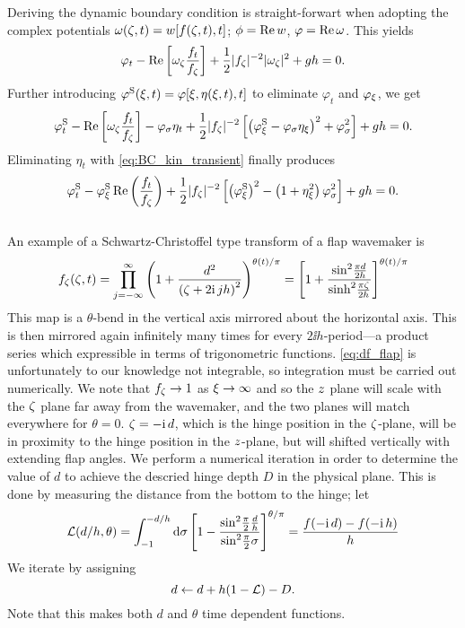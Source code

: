 Deriving the dynamic boundary condition is straight-forwart when adopting the complex potentials $\omega(\zeta,t)=w[f(\zeta,t),t]$; $\phi=\operatorname{Re}w$, $\varphi = \operatorname{Re}\omega$.
This yields
\begin{equation}
\varphi_t - \operatorname{Re}\left[\omega_\zeta \frac{f_t}{f_\zeta}\right] + \frac12|f_\zeta|^{-2}|\omega_\zeta|^2 + gh = 0.
\label{eq:}
\end{equation}
Further introducing $\varphi^\mathrm{S}(\xi,t)=\varphi[\xi,\eta(\xi,t),t]$ to eliminate $\varphi_t$ and $\varphi_\xi$, we get 
\begin{equation*}
\varphi^\mathrm{S}_t - \operatorname{Re}\left[\omega_\zeta \frac{f_t}{f_\zeta}\right]-\varphi_\sigma \eta_t
 + \frac12|f_\zeta|^{-2}\left[\left(\varphi^\mathrm{S}_\xi-\varphi_\sigma\eta_\xi\right)^2+\varphi_\sigma^2\right] + gh = 0.
\end{equation*}
%
Eliminating $\eta_t$ with \eqref{eq:BC_kin_transient} finally produces
\begin{equation}
\varphi^\mathrm{S}_t - \varphi^\mathrm{S}_\xi \operatorname{Re}\left( \frac{f_t}{f_\zeta}\right)
 + \frac12|f_\zeta|^{-2}\left[\left(\varphi^\mathrm{S}_\xi\right)^2-\left(1+\eta_\xi^2\right)\varphi_\sigma^2\right] + gh = 0.
\label{eq:BC_dyn_transient}
\end{equation}
\\

An example of a Schwartz-Christoffel type transform of a flap wavemaker is
\begin{equation}
f_\zeta(\zeta,t) = \prod_{j=-\infty}^\infty \left(1+\frac{d^2}{\left(\zeta+2\mathrm{i}\, j h\right)^2}\right)^{\theta(t)/\pi}
= \left[1+\frac{\sin^2\!\frac{\pi d}{2h}}{\sinh^2\!\frac{\pi \zeta}{2h}}\right]^{\theta(t)/\pi}
\label{eq:df_flap}
\end{equation}
This map is a $\theta$-bend in the vertical axis mirrored about the horizontal axis.
This is then mirrored again infinitely many times for every $2\ii h$-period---a product series which expressible in terms of trigonometric functions.
\eqref{eq:df_flap} is unfortunately to our knowledge not integrable, so integration must be carried out numerically. 
We note that $f_\zeta\to1$ as $\xi\to\infty$ and so the $z$ plane will scale with the $\zeta$ plane far away from the wavemaker, and the two planes will match everywhere for $\theta=0$. $\zeta=-\mathrm{i}\, d$, which is the hinge position in the $\zeta$-plane, will be in proximity to the hinge position in the $z$-plane, but will shifted vertically with extending flap angles. We perform a numerical iteration in order to determine the value of $d$ to achieve the descried hinge depth $D$ in the physical plane. This is done by measuring the distance from the bottom to the hinge;
let
\begin{equation}
\mathcal L(d/h,\theta) = \int_{-1}^{-d/h} \mathrm d \sigma \left[1-\frac{\sin^2\!\frac{\pi}{2}\frac{d}{h}}{\sin^2\!\frac{\pi}{2}\sigma}\right]^{\theta/\pi} = \frac{f(-\mathrm{i}\, d)-f(-\mathrm{i}\, h)}h
\label{eq:L}
\end{equation}
We iterate by assigning
\[
d\leftarrow d + h(1-\mathcal L) - D.
\]
Note that this makes both $d$ and $\theta$ time dependent functions.
 
